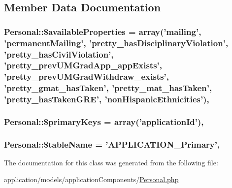 \subsection{Member Data Documentation}
\hypertarget{class_personal_ad76d9b6b0264688fd564f3bb48eca2d9}{
\subsubsection[{\$available\-Properties}]{\setlength{\rightskip}{0pt plus 5cm}Personal\-::\$available\-Properties = array('mailing', 'permanent\-Mailing', 'pretty\-\_\-has\-Disciplinary\-Violation', 'pretty\-\_\-has\-Civil\-Violation', 'pretty\-\_\-prev\-U\-M\-Grad\-App\-\_\-app\-Exists', 'pretty\-\_\-prev\-U\-M\-Grad\-Withdraw\-\_\-exists', 'pretty\-\_\-gmat\-\_\-has\-Taken', 'pretty\-\_\-mat\-\_\-has\-Taken', 'pretty\-\_\-has\-Taken\-G\-R\-E', 'non\-Hispanic\-Ethnicities')\hspace{0.3cm}{\ttfamily [static]}, {\ttfamily [protected]}}}\label{class_personal_ad76d9b6b0264688fd564f3bb48eca2d9}
\hypertarget{class_personal_a0901c6d431e685dffd62bfbfae506f47}{
\subsubsection[{\$primary\-Keys}]{\setlength{\rightskip}{0pt plus 5cm}Personal\-::\$primary\-Keys = array('application\-Id')\hspace{0.3cm}{\ttfamily [static]}, {\ttfamily [protected]}}}\label{class_personal_a0901c6d431e685dffd62bfbfae506f47}
\hypertarget{class_personal_ae8c9712c2db496135b59030f0ffd4acf}{
\subsubsection[{\$table\-Name}]{\setlength{\rightskip}{0pt plus 5cm}Personal\-::\$table\-Name = 'A\-P\-P\-L\-I\-C\-A\-T\-I\-O\-N\-\_\-\-Primary'\hspace{0.3cm}{\ttfamily [static]}, {\ttfamily [protected]}}}\label{class_personal_ae8c9712c2db496135b59030f0ffd4acf}


The documentation for this class was generated from the following file\-:\begin{DoxyCompactItemize}
\item 
application/models/application\-Components/\hyperlink{_personal_8php}{Personal.\-php}\end{DoxyCompactItemize}
